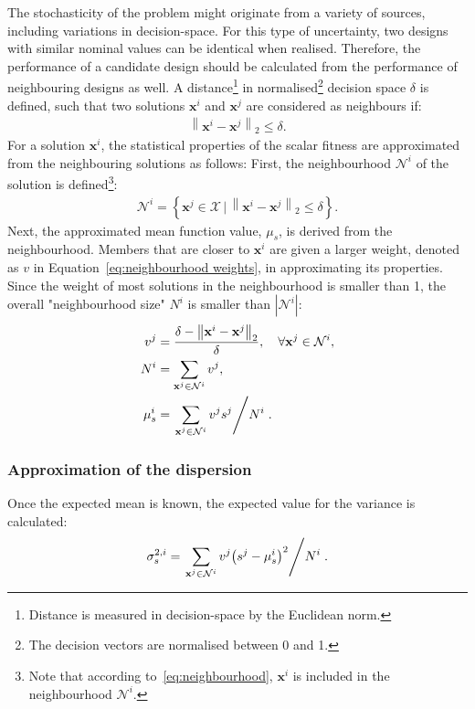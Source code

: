 \documentclass{llncs}
\newcommand{\brr}[1]{{\left({#1}\right)}} %
\newcommand{\brf}[1]{\left\lbrace{#1}\right\rbrace} %
\newcommand{\brabs}[1]{\left\vert{#1}\right\vert} %
\newcommand{\norm}[2]{\left\|{#1}\right\|_{#2}} %
\newcommand{\vx}{\mathbf{x}} %
\newcommand{\NSet}{\mathcal{N}} %
\newcommand{\XSet}{\mathcal{X}} %
\begin{document}
The stochasticity of the problem might originate from a variety of sources, including variations in decision-space. For this type of uncertainty, two designs with similar nominal values can be identical when realised. Therefore, the performance of a candidate design should be calculated from the performance of neighbouring designs as well. A distance\footnote{Distance is measured in decision-space by the Euclidean norm.} in normalised\footnote{The decision vectors are normalised between 0 and 1.} decision space $\delta$ is defined, such that two solutions $\vx^i$ and $\vx^j$ are considered as neighbours if:
\begin{align}
	\norm{\vx^i-\vx^j}{2}\leq\delta.
\end{align}
For a solution $\vx^i$, the statistical properties of the scalar fitness are approximated from the neighbouring solutions as follows:
First, the neighbourhood $\NSet^i$ of the solution is defined\footnote{Note that according to~\eqref{eq:neighbourhood}, $\vx^i$ is included in the neighbourhood $\NSet^i$.}:
\begin{align}
	\label{eq:neighbourhood}
	\NSet^i=\brf{\vx^j\in \XSet \,\vert \,\norm{\vx^i-\vx^j}{2}\leq\delta}.
\end{align}
Next, the approximated mean function value, $\mu_s$, is derived from the neighbourhood.
Members that are closer to $\vx^i$ are given a larger weight, denoted as $v$ in Equation~\eqref{eq:neighbourhood weights}, in approximating its properties.
Since the weight of most solutions in the neighbourhood is smaller than 1, the overall "neighbourhood size" $N^i$ is smaller than $\brabs{\NSet^i}$:
\begin{align}
	\label{eq:neighbourhood weights}
	v^j &= \frac{\delta-\norm{\vx^i-\vx^j}{2}}{\delta}, \quad  \forall \vx^j\in\NSet^i,\\
	\label{eq:neighbourhood size}
	N^i &= \sum_{\vx^j\in\NSet^i} v^j,\\
	\label{eq:neighbourhood mean}
	\mu^i_s &= \left. \sum_{\vx^j\in\NSet^i} v^j s^j \middle/ N^i \right. .
\end{align}

\subsubsection{Approximation of the dispersion}

Once the expected mean is known, the expected value for the variance is calculated:
\begin{align}
	\label{eq:neighbourhood variance}	\sigma^{2,i}_s = \left. \sum_{\vx^j\in\NSet^i} v^j \brr{s^j - \mu^i_s}^2 \middle/ N^i \right. .
\end{align}
\end{document}
